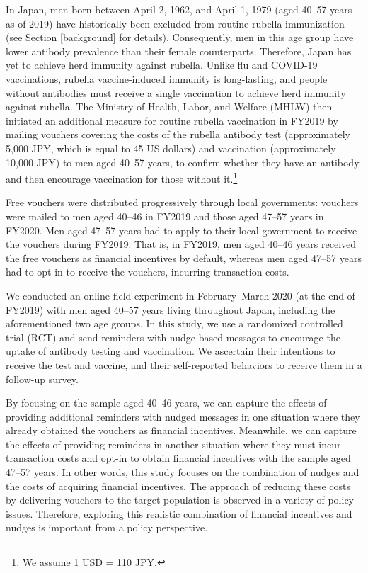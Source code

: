 \documentclass[
]{article}
\begin{document}
In Japan, men born between April 2, 1962, and April 1, 1979 (aged 40--57 years as of 2019) have historically been excluded from routine rubella immunization (see Section \ref{background} for details). Consequently, men in this age group have lower antibody prevalence than their female counterparts. Therefore, Japan has yet to achieve herd immunity against rubella. Unlike flu and COVID-19 vaccinations, rubella vaccine-induced immunity is long-lasting, and people without antibodies must receive a single vaccination to achieve herd immunity against rubella. The Ministry of Health, Labor, and Welfare (MHLW) then initiated an additional measure for routine rubella vaccination in FY2019 by mailing vouchers covering the costs of the rubella antibody test (approximately 5,000 JPY, which is equal to 45 US dollars) and vaccination (approximately 10,000 JPY) to men aged 40--57 years, to confirm whether they have an antibody and then encourage vaccination for those without it.\footnote{We assume 1 USD = 110 JPY.}

Free vouchers were distributed progressively through local governments: vouchers were mailed to men aged 40--46 in FY2019 and those aged 47--57 years in FY2020. Men aged 47--57 years had to apply to their local government to receive the vouchers during FY2019. That is, in FY2019, men aged 40--46 years received the free vouchers as financial incentives by default, whereas men aged 47--57 years had to opt-in to receive the vouchers, incurring transaction costs.

We conducted an online field experiment in February--March 2020 (at the end of FY2019) with men aged 40--57 years living throughout Japan, including the aforementioned two age groups. In this study, we use a randomized controlled trial (RCT) and send reminders with nudge-based messages to encourage the uptake of antibody testing and vaccination. We ascertain their intentions to receive the test and vaccine, and their self-reported behaviors to receive them in a follow-up survey.

By focusing on the sample aged 40--46 years, we can capture the effects of providing additional reminders with nudged messages in one situation where they already obtained the vouchers as financial incentives. Meanwhile, we can capture the effects of providing reminders in another situation where they must incur transaction costs and opt-in to obtain financial incentives with the sample aged 47--57 years. In other words, this study focuses on the combination of nudges and the costs of acquiring financial incentives. The approach of reducing these costs by delivering vouchers to the target population is observed in a variety of policy issues. Therefore, exploring this realistic combination of financial incentives and nudges is important from a policy perspective.
\end{document}
